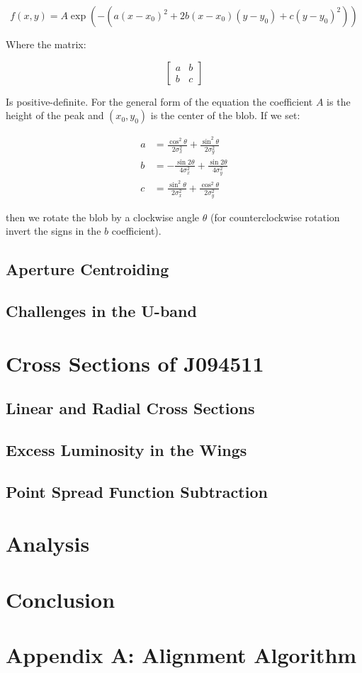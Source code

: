 \documentclass[a4paper,11pt]{article}
\begin{document}
\begin{equation}
    f(x,y) = A \exp\left(- \left(a(x - x_0)^2 + 2b(x-x_0)(y-y_0) + c(y-y_0)^2 \right)\right)
\end{equation}

\noindent Where the matrix:

\begin{equation}
    \begin{bmatrix} a & b \\ b & c \end{bmatrix}
\end{equation}

\noindent Is positive-definite. For the general form of the equation the
coefficient $A$ is the height of the peak and $(x_0, y_0)$ is the center of the
blob. If we set:

\begin{align}
a & = \frac{\cos^2\theta}{2\sigma_x^2} + \frac{\sin^2\theta}{2\sigma_y^2} \\
b & = -\frac{\sin2\theta}{4\sigma_x^2} + \frac{\sin2\theta}{4\sigma_y^2} \\
c & = \frac{\sin^2\theta}{2\sigma_x^2} + \frac{\cos^2\theta}{2\sigma_y^2}
\end{align}

then we rotate the blob by a clockwise angle $\theta$ (for counterclockwise
rotation invert the signs in the $b$ coefficient). %

\subsection{Aperture Centroiding}
\subsection{Challenges in the U-band}
\section{Cross Sections of J094511}
\subsection{Linear and Radial Cross Sections}
\subsection{Excess Luminosity in the Wings}
\subsection{Point Spread Function Subtraction}
\section{Analysis}
\section{Conclusion}




\section*{Appendix A: Alignment Algorithm}
\end{document}

